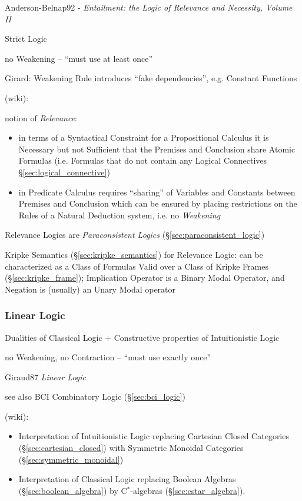 Anderson-Belnap92 - \emph{Entailment: the Logic of Relevance and
  Necessity, Volume II}

Strict Logic

no Weakening -- ``must use at least once''

Girard: Weakening Rule introduces ``fake dependencies'', e.g. Constant
Functions

(wiki):

notion of \emph{Relevance}:
\begin{itemize}
  \item in terms of a Syntactical Constraint for a
    Propositional Calculus it is Necessary but not Sufficient that the
    Premises and Conclusion share Atomic Formulas (i.e. Formulas that do
    not contain any Logical Connectives \S\ref{sec:logical_connective})
  \item in Predicate Calculus requires ``sharing'' of Variables and
    Constants between Premises and Conclusion which can be ensured by
    placing restrictions on the Rules of a Natural Deduction system,
    i.e. no \emph{Weakening}
\end{itemize}

Relevance Logics are \emph{Paraconsistent Logics}
(\S\ref{sec:paraconsistent_logic})

Kripke Semantics (\S\ref{sec:kripke_semantics}) for Relevance Logic:
can be characterized as a Class of Formulas Valid over a Class of
Kripke Frames (\S\ref{sec:kripke_frame}); Implication Operator is a
Binary Modal Operator, and Negation is (usually) an Unary Modal
operator



\subsubsection{Linear Logic}\label{sec:linear_logic}

Dualities of Classical Logic + Constructive properties of
Intuitionistic Logic

no Weakening, no Contraction -- ``must use exactly once''

Giraud87 \emph{Linear Logic}

\fist see also BCI Combinatory Logic (\S\ref{sec:bci_logic})

(wiki):

\begin{itemize}
\item Interpretation of Intuitionistic Logic replacing Cartesian Closed
  Categories (\S\ref{sec:cartesian_closed}) with Symmetric Monoidal
  Categories (\S\ref{sec:symmetric_monoidal})
\item Interpretation of Classical Logic replacing Boolean Algebras
  (\S\ref{sec:boolean_algebra}) by C$^*$-algebras
  (\S\ref{sec:cstar_algebra}).
\end{itemize}

